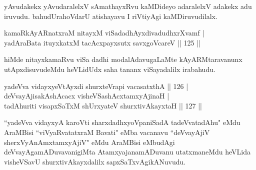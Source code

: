 \begin{artha}
yAvudakekx yAvudaralelxV sAmathayxRvu kaMDideyo adaralelxV adakekx adu iruvudu. bahudUrahoVdarU atishayavu I riVtiyAgi kaMDiruvudilalx.
\end{artha}

\begin{shl}
kamaRkAyARnatxraM nitayxM viSadadhAyxdivadudhxrXvamf |\\
yadAraBata ituyxkatxM tacAcxpayxsutx savxgoVcareV \hfill || 125 ||
\end{shl}

\begin{artha}
hiMde nitayxkamaRvu viSa dadhi modalAdavugaLaMte kAyARMtaravanunx utApxdisuvudeMdu heVLidUdx saha tananx viSayadalilx irabahudu.
\end{artha}

\begin{shl}
yadeVva vidayxyeVtAyxdi shurxteVrapi vacasatxthA \hfill || 126 |\\
deVvayAjisakAshAcacx visheVSashAcx\s \s tamxyAjinaH |\\
tadAhuriti visapxSaTxM shUrxyateV shurxtivAkayxtaH \hfill || 127 ||
\end{shl}

\begin{artha}
``yadeVva vidayxyA karoVti sharxdadhxyoVpaniSadA tadeVva\break tadAhu"  eMdu AraMBisi ``viVyaRvatatxraM Bavati" eMba vacanavu ``deVvayAjiV sherxVyAnAmxtamxyAjiV" eMdu AraMBisi eMbudAgi deVvayAgamADuvavanigiMta AtamxyajanamADuvanu utatxmaneMdu heVLida visheVSavU shurxtivAkayxdalilx sapxSaTxvAgikANuvudu.
\end{artha}

